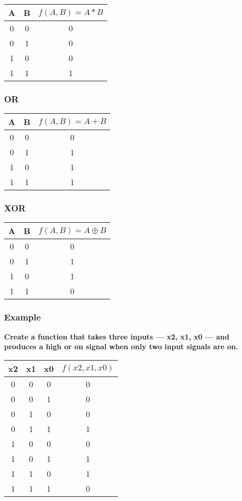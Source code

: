\documentclass[11pt]{article}
\begin{document}
\begin{table}[H]
	\centering
	\begin{tabular}{c c | c}
		A	&	B	&	\( f(A,B) = A * B \)\\
		\hline
		0	&	0	&	0\\
		0	&	1	&	0\\
		1	&	0	&	0\\
		1	&	1	&	1
	\end{tabular}
\end{table}

\subsubsection{OR}

\begin{table}[H]
	\centering
	\begin{tabular}{c c | c}
		A	&	B	&	\( f(A,B) = A + B \)\\
		\hline
		0	&	0	&	0\\
		0	&	1	&	1\\
		1	&	0	&	1\\
		1	&	1	&	1
	\end{tabular}
\end{table}

\subsubsection{XOR}

\begin{table}[H]
	\centering
	\begin{tabular}{c c | c}
		A	&	B	&	\( f(A,B) = A \oplus B \)\\
		\hline
		0	&	0	&	0\\
		0	&	1	&	1\\
		1	&	0	&	1\\
		1	&	1	&	0
	\end{tabular}
\end{table}

\subsubsection{Example}

\textbf{Create a function that takes three inputs --- x2, x1, x0 --- and produces a high or on signal when only two input signals are on.}

\begin{table}[H]
	\centering
	\begin{tabular}{c c c | c}
		x2	&	x1	&	x0	&	\( f(x2,x1,x0) \)\\
		\hline
		0	&	0	&	0	&	0\\
		0	&	0	&	1	&	0\\
		0	&	1	&	0	&	0\\
		0	&	1	&	1	&	1\\
		1	&	0	&	0	&	0\\
		1	&	0	&	1	&	1\\
		1	&	1	&	0	&	1\\
		1	&	1	&	1	&	0
	\end{tabular}
\end{table}
\end{document}
